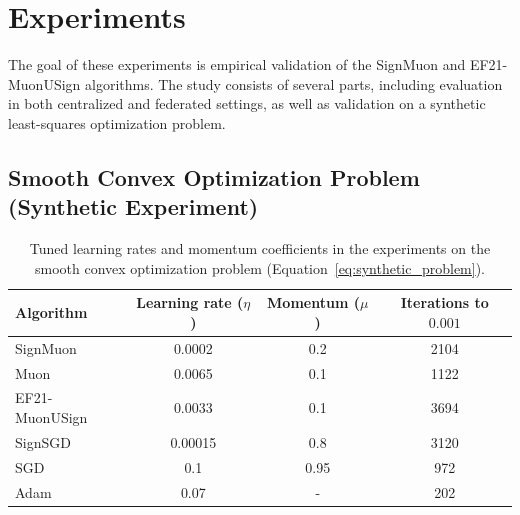 \documentclass[letterpaper]{article} %
\begin{document}
\section{Experiments}\label{sec:exp}
The goal of these experiments is empirical validation of the SignMuon and EF21-MuonUSign algorithms. The study consists of several parts, including evaluation in both centralized and federated settings, as well as validation on a synthetic least-squares optimization problem.

\subsection{Smooth Convex Optimization Problem (Synthetic Experiment)}

\begin{table}[!t]
\centering
\footnotesize
\renewcommand{\arraystretch}{1.2}
\begin{tabular}{|l|c|c|c|}
\hline
\textbf{Algorithm} & \textbf{Learning rate ($\eta$)} & \textbf{Momentum ($\mu$)} & \textbf{Iterations to $0.001$} \\
\hline
SignMuon & 0.0002 & 0.2 & 2104 \\
Muon & 0.0065 & 0.1 & 1122 \\
EF21-MuonUSign & 0.0033 & 0.1 & 3694 \\
SignSGD & 0.00015 & 0.8 & 3120 \\
SGD & 0.1 & 0.95 & 972 \\
Adam &  0.07 & - & 202 \\
\hline
\end{tabular}
\caption{Tuned learning rates and momentum coefficients in the experiments on the smooth convex optimization problem (Equation~\ref{eq:synthetic_problem}).}
\label{tab:synthetic_results}
\end{table}
\end{document}
